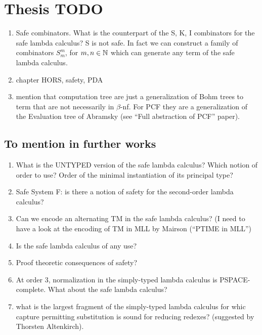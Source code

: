 \documentclass{article}
\begin{document}
\section{Thesis TODO}
\begin{enumerate}
\item Safe combinators. What is the counterpart of the S, K, I combinators for the safe lambda calculus? S is not safe. In fact we can construct a family of combinators $S_m^m$, for $m,n\in\mathbb{N}$ which can generate any term of the safe lambda calculus.

\item chapter HORS, safety, PDA

\item mention that computation tree are just a generalization of Bohm trees to term that are not necessarily in $\beta$-nf. For PCF they are a generalization of the Evaluation tree of Abramsky (see ``Full abstraction of PCF'' paper).

\end{enumerate}


\subsection{To mention in further works}
\begin{enumerate}
\item What is the UNTYPED version of the safe lambda calculus?
Which notion of order to use? Order of the minimal instantiation of its principal type?

\item Safe System F: is there a notion of safety for the second-order lambda calculus?

\item Can we encode an alternating TM in the safe lambda calculus?
(I need to have a look at the encoding of TM in MLL by Mairson (``PTIME in MLL'')

\item Is the safe lambda calculus of any use?

\item Proof theoretic consequences of safety?

\item At order $3$, normalization in the simply-typed lambda calculus is PSPACE-complete. What about the safe lambda calculus?

\item what is the largest fragment of the simply-typed lambda calculus for whic capture permitting substitution is sound for reducing redexes? (suggested by Thorsten Altenkirch).
\end{enumerate}
\end{document}
